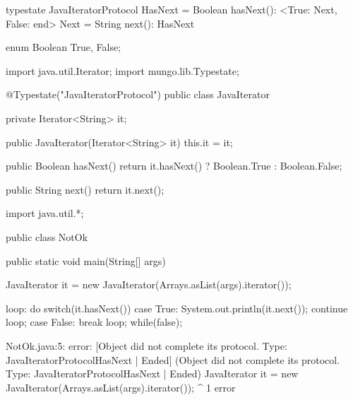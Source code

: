 \begin{code}
typestate JavaIteratorProtocol {
  HasNext = {
    Boolean hasNext(): <True: Next, False: end>
  }
  Next = {
    String next(): HasNext
  }
}\end{code}

\begin{code}
enum Boolean {
	True, False;
}\end{code}

\begin{code}
import java.util.Iterator;
import mungo.lib.Typestate;

@Typestate("JavaIteratorProtocol")
public class JavaIterator {

  private Iterator<String> it;

  public JavaIterator(Iterator<String> it) {
    this.it = it;
  }

	public Boolean hasNext() {
    return it.hasNext() ? Boolean.True : Boolean.False;
  }

  public String next() {
    return it.next();
  }

}\end{code}

\begin{code}
import java.util.*;

public class NotOk {
	public static void main(String[] args) {
		JavaIterator it = new JavaIterator(Arrays.asList(args).iterator());

    loop: do {
      switch(it.hasNext()) {
        case True:
          System.out.println(it.next());
          continue loop;
        case False:
          break loop;
      }
    } while(false);
	}
}\end{code}

\lstset{caption=Original Mungo output}
\begin{code}
\end{code}

\lstset{caption=New Mungo output}
\begin{code}
NotOk.java:5: error: [Object did not complete its protocol. Type: JavaIteratorProtocol{HasNext} | Ended] (Object did not complete its protocol. Type: JavaIteratorProtocol{HasNext} | Ended)
		JavaIterator it = new JavaIterator(Arrays.asList(args).iterator());
		             ^
1 error
\end{code}

